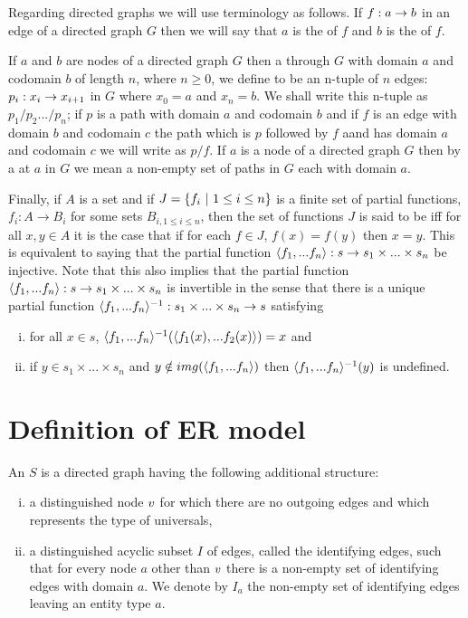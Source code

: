 Regarding directed graphs we will use terminology as follows. If $f: a \rightarrow b$ in an edge of a directed graph $G$ then we will say that $a$ is the  of $f$ and $b$ is the  of $f$.

If $a$ and $b$ are nodes of a directed graph $G$ then a  through $G$ with domain $a$ and 
codomain $b$ of length $n$, where $n \geq 0$, we define to be  an n-tuple of  $n$ edges: $p_i: x_i \rightarrow x_{i+1} $ in $G$ where $x_0=a$ and $x_n=b$. We shall write this n-tuple as $p_1/p_2.../p_n$; if 
$p$ is a path with domain $a$ and codomain $b$ and if $f$ is an edge with domain $b$ and codomain
$c$ the path which is $p$ followed by $f$ aand has domain $a$ and codomain $c$ we will write as $p/f$.
If $a$ is a node of a directed graph $G$ then by a  at $a$ in $G$ we mean a non-empty set of paths in $G$ each with domain $a$.

Finally, if $A$ is a set and if $J= \left\{f_i \ \middle|\  1\leq i \leq n\right\}$ is a finite set of partial functions, $f_i: A \rightarrow B_i$   for some sets $B_{i, 1 \leq i \leq n}$,  then the set of functions 
$J$ is said to be  iff for all $x,y \in A$ it is the case that  if  for each 
$f \in J$, $f(x)=f(y)$ then $x=y$. 
This  is equivalent to saying that  the partial function $\langle f_1,...f_n\rangle: s \rightarrow s_1 \times ... \times s_n $ be injective. Note that this also implies that the partial function $\langle f_1,...f_n\rangle: s \rightarrow s_1 \times ... \times s_n $ is invertible in the sense that there is a unique partial function $\langle f_1,...f_n\rangle^{-1} : s_1 \times ... \times s_n \rightarrow s$ satisfying
\begin{enumerate} [(i)]
\item for all $x \in s$, $\langle f_1,...f_n\rangle^{-1}(\langle f_1(x),...f_2(x) \rangle ) = x$ and 
\item  if $y \in s_1 \times ... \times s_n $ and
$y \notin img(\langle f_1,...f_n\rangle)$ then $\langle f_1,...f_n\rangle^{-1}(y)$ is undefined. 
\end{enumerate}
 
\section{Definition of ER model}

\begin{definition}
An  $S$ is a directed graph having the following additional structure:
\begin{enumerate} [(i)]
\item{a distinguished node $v$ for which there are no outgoing edges and which represents the type of universals, }
\item{a distinguished acyclic subset $I$ of edges, called the identifying edges, such that
for every node $a$ other than $v$ there is a non-empty set  of identifying edges with domain $a$.
 We denote by $I_a$ the non-empty set of identifying edges leaving an entity type $a$.}
\end{enumerate}
\end{definition}
 
